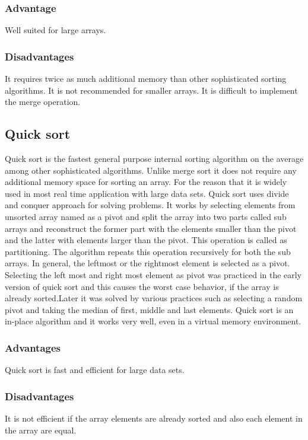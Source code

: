 \documentclass{article}
\begin{document}
\subsubsection{Advantage}
	Well suited for large arrays.

\subsubsection{Disadvantages}
	It requires twice as much additional memory than other sophisticated sorting algorithms.
	It is not recommended for smaller arrays. 
	It is difficult to implement the merge operation.

\subsection{Quick sort}
	Quick sort is the fastest general purpose internal sorting algorithm on the average among other sophisticated algorithms. Unlike merge sort it does not require any additional memory space for sorting an array. For the reason that it is widely used in most real time application with large data sets. Quick sort uses divide and conquer approach for solving problems. It works by selecting elements from unsorted array named as a pivot and split the array into two parts called sub arrays and reconstruct the former part with the elements smaller than the pivot and the latter with elements larger than the pivot. This operation is called as partitioning. The algorithm repeats this operation recursively for both the sub arrays. In general, the leftmost or the rightmost element is selected as a pivot. Selecting the left most and right most element as pivot was practiced in the early version of quick sort and this causes the worst case behavior, if the array is already sorted.Later it was solved by various practices such as selecting a random pivot and taking the median of first, middle and last elements. Quick sort is an in-place algorithm and it works very well, even in a virtual memory environment.

\subsubsection{Advantages}
	Quick sort is fast and efficient for large data sets. 

\subsubsection{Disadvantages}
	It is not efficient if the array elements are already sorted and also each element in the array are equal.
	
\end{document}
